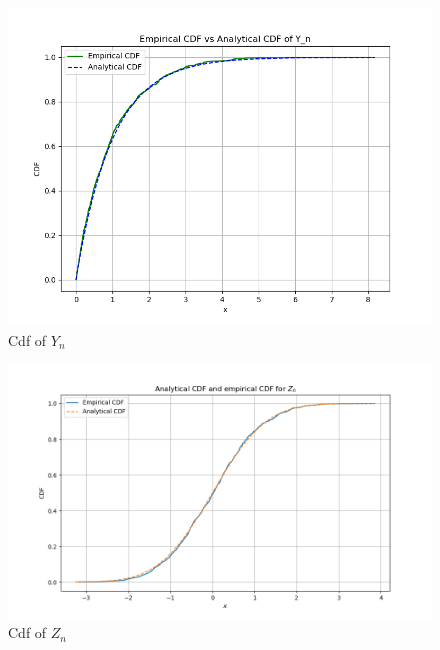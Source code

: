\documentclass[journal,12pt,twocolumn]{IEEEtran}
\begin{document}
\begin{figure}[ht]
\includegraphics[width=\columnwidth]{./figs/Figure_14.png}
\caption{Cdf of $Y_n$}
\label{fig:2023/ST/61/7}
\end{figure}
\begin{figure}[ht]
\includegraphics[width=\columnwidth]{./figs/Figure_15.png}
\caption{Cdf of $Z_n$}
\label{fig:2023/ST/61/8}
\end{figure}
\end{document}
